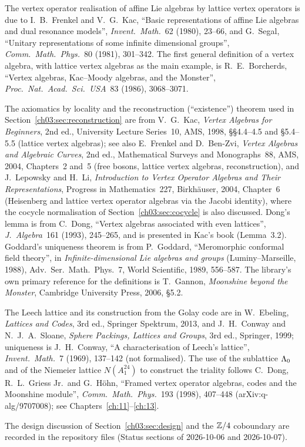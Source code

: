 The vertex operator realisation of affine Lie algebras by lattice vertex operators is due to
I.~B.~Frenkel and V.~G.~Kac, ``Basic representations of affine Lie algebras and dual resonance
models'', \emph{Invent.\ Math.}~62 (1980), 23--66, and G.~Segal, ``Unitary representations of some
infinite dimensional groups'', \emph{Comm.\ Math.\ Phys.}~80 (1981), 301--342. The first general
definition of a vertex algebra, with lattice vertex algebras as the main example, is
R.~E.~Borcherds, ``Vertex algebras, Kac--Moody algebras, and the Monster'', \emph{Proc.\ Nat.\
Acad.\ Sci.\ USA}~83 (1986), 3068--3071.

The axiomatics by locality and the reconstruction (``existence'') theorem used in
Section~\ref{ch03:sec:reconstruction} are from V.~G.~Kac, \emph{Vertex Algebras for Beginners},
2nd ed., University Lecture Series~10, AMS, 1998, \S\S4.4--4.5 and \S5.4--5.5 (lattice vertex
algebras); see also E.~Frenkel and D.~Ben-Zvi, \emph{Vertex Algebras and Algebraic Curves},
2nd ed., Mathematical Surveys and Monographs~88, AMS, 2004, Chapters~2 and~5 (free bosons,
lattice vertex algebras, reconstruction), and J.~Lepowsky and H.~Li, \emph{Introduction to Vertex
Operator Algebras and Their Representations}, Progress in Mathematics~227, Birkh\"auser, 2004,
Chapter~6 (Heisenberg and lattice vertex operator algebras via the Jacobi identity), where
the cocycle normalisation of Section~\ref{ch03:sec:cocycle} is also discussed. Dong's lemma is from
C.~Dong, ``Vertex algebras associated with even lattices'', \emph{J.\ Algebra}~161 (1993),
245--265, and is presented in Kac's book (Lemma~3.2). Goddard's uniqueness theorem is from
P.~Goddard, ``Meromorphic conformal field theory'', in \emph{Infinite-dimensional Lie algebras and
groups} (Luminy--Marseille, 1988), Adv.\ Ser.\ Math.\ Phys.~7, World Scientific, 1989, 556--587.
The library's own primary reference for the definitions is T.~Gannon, \emph{Moonshine beyond the
Monster}, Cambridge University Press, 2006, \S5.2.

The Leech lattice and its construction from the Golay code are in W.~Ebeling, \emph{Lattices and
Codes}, 3rd ed., Springer Spektrum, 2013, and J.~H.~Conway and N.~J.~A.~Sloane, \emph{Sphere
Packings, Lattices and Groups}, 3rd ed., Springer, 1999; uniqueness is J.~H.~Conway, ``A
characterisation of Leech's lattice'', \emph{Invent.\ Math.}~7 (1969), 137--142 (not formalised).
The use of the sublattice ${\Lambda}_0$ and of the Niemeier lattice $N(A_1^{24})$ to construct the
triality follows C.~Dong, R.~L.~Griess Jr.\ and G.~H\"ohn, ``Framed vertex operator algebras,
codes and the Moonshine module'', \emph{Comm.\ Math.\ Phys.}~193 (1998), 407--448
(arXiv:q-alg/9707008); see Chapters~\ref{ch:11}--\ref{ch:13}.

The design discussion of Section~\ref{ch03:sec:design} and the ${\mathbb{Z}}/4$ coboundary are recorded in
the repository files \leanpath{Notes/M8GluingPlan.md} (Status sections of 2026-10-06 and
2026-10-07).
\endgroup
